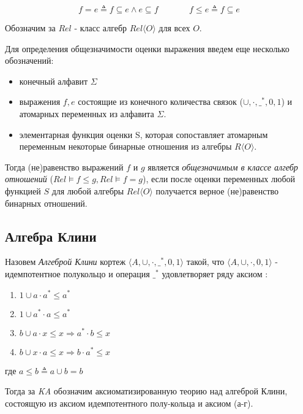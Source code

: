 \documentclass[times
              ,specification
              ,annotation
              ]{itmo-student-thesis}
\begin{document}
      $$ f = e \triangleq f \subseteq e \wedge e \subseteq f \;\;\;\;\;\;\;\;\;\;\;\;\; f \leq e \triangleq f \subseteq e $$

      Обозначим за $\mathit{Rel}$ - класс алгебр $ \mathit{Rel}\langle O \rangle $ для всех $ O $.

      Для определения общезначимости оценки выражения введем еще несколько обозначений:
      \begin{itemize}
        \item конечный алфавит $ \Sigma $
        \item выражения $ f, e $ состоящие из конечного количества связок
        ($ \cup, \cdot, \_^* , 0, 1 $) и атомарных переменных из алфавита $ \Sigma $.
        \item элементарная функция оценки S, которая сопоставляет атомарным переменным некоторые
          бинарные отношения из алгебры $ R \langle O \rangle $.
      \end{itemize}
      Тогда (не)равенство выражений $ f $ и $ g $ является \textit{общезначимым в классе алгебр отношений}
      ($\mathit{Rel} \models f \leq g, \mathit{Rel} \models f = g $),
      если после оценки переменных любой функцией $ S $ для любой алгебры $ \mathit{Rel}\langle O \rangle $
      получается верное (не)равенство бинарных отношений.
      
    \subsection{Алгебра Клини}
      Назовем \textit{Алгеброй Клини} кортеж $\langle A,\cup,\cdot,\_^*,0,1\rangle$ такой, что $\langle A, \cup, \cdot, 0, 1 \rangle$ -
      идемпотентное полукольцо и операция $ \_^* $ удовлетворяет ряду аксиом \cite{ka_axioms}:
      \begin{enumerate}
        \item $ 1 \cup a \cdot a^* \leq a^* $
        \item $ 1 \cup a^* \cdot a \leq a^* $
        \item $ b \cup a \cdot x \leq x \Rightarrow a^* \cdot b \leq x $
        \item $ b \cup x \cdot a \leq x \Rightarrow b \cdot a^* \leq x $
      \end{enumerate}
      где  $ a \leq b \triangleq a \cup b = b$

      Тогда за \textit{KA} обозначим аксиоматизированную теорию над алгеброй Клини, состоящую из аксиом
      идемпотентного полу-кольца и аксиом (а-г).
\end{document}
